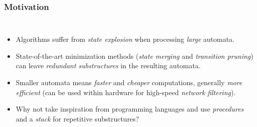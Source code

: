 \begin{frame}
  \frametitle{Motivation}
  \begin{columns}
    \begin{itemize}
      \item Algorithms suffer from \emph{state explosion} when processing \emph{large} automata.\justifying\vspace*{0.5em}
      \item<2-> State-of-the-art minimization methods (\emph{state merging} and \emph{transition pruning}) can leave \emph{redundant substructures} in the resulting automata.\justifying\vspace*{0.5em}
      \item<3-> Smaller automata means \emph{faster} and \emph{cheaper} computations, generally \emph{more efficient} (can be used within hardware for high-speed \emph{network filtering}).\justifying\vspace*{0.5em}
      \item<4-> Why not take inspiration from programming languages and use \emph{procedures} and a \emph{stack} for repetitive substructures?\justifying
    \end{itemize}


\end{columns}
\end{frame}
